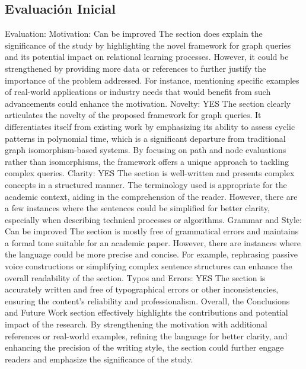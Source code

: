 \documentclass{article}%
\begin{document}
%
\subsection{Evaluación Inicial}%
\label{subsec:EvaluacinInicial}%
Evaluation:\newline%
\newline%
Motivation: Can be improved\newline%
The section does explain the significance of the study by highlighting the novel framework for graph queries and its potential impact on relational learning processes. However, it could be strengthened by providing more data or references to further justify the importance of the problem addressed. For instance, mentioning specific examples of real{-}world applications or industry needs that would benefit from such advancements could enhance the motivation.\newline%
\newline%
Novelty: YES\newline%
The section clearly articulates the novelty of the proposed framework for graph queries. It differentiates itself from existing work by emphasizing its ability to assess cyclic patterns in polynomial time, which is a significant departure from traditional graph isomorphism{-}based systems. By focusing on path and node evaluations rather than isomorphisms, the framework offers a unique approach to tackling complex queries.\newline%
\newline%
Clarity: YES\newline%
The section is well{-}written and presents complex concepts in a structured manner. The terminology used is appropriate for the academic context, aiding in the comprehension of the reader. However, there are a few instances where the sentences could be simplified for better clarity, especially when describing technical processes or algorithms.\newline%
\newline%
Grammar and Style: Can be improved\newline%
The section is mostly free of grammatical errors and maintains a formal tone suitable for an academic paper. However, there are instances where the language could be more precise and concise. For example, rephrasing passive voice constructions or simplifying complex sentence structures can enhance the overall readability of the section.\newline%
\newline%
Typos and Errors: YES\newline%
The section is accurately written and free of typographical errors or other inconsistencies, ensuring the content's reliability and professionalism.\newline%
\newline%
Overall, the Conclusions and Future Work section effectively highlights the contributions and potential impact of the research. By strengthening the motivation with additional references or real{-}world examples, refining the language for better clarity, and enhancing the precision of the writing style, the section could further engage readers and emphasize the significance of the study.
\end{document}
